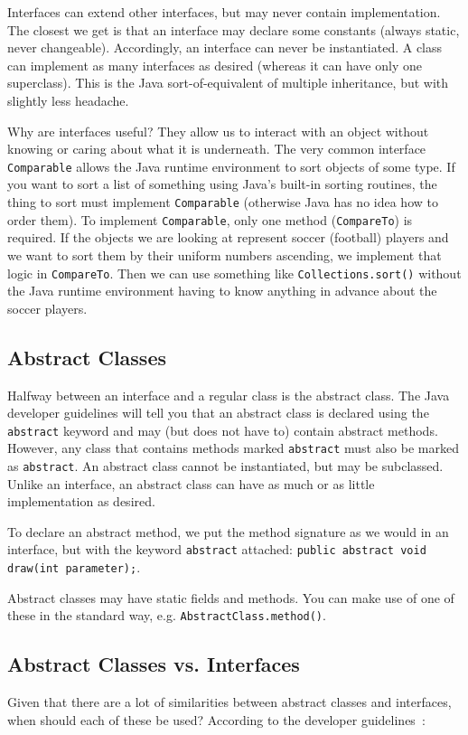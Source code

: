 Interfaces can extend other interfaces, but may never contain implementation. The closest we get is that an interface may declare some constants (always static, never changeable). Accordingly, an interface can never be instantiated. A class can implement as many interfaces as desired (whereas it can have only one superclass). This is the Java sort-of-equivalent of multiple inheritance, but with slightly less headache.

Why are interfaces useful? They allow us to interact with an object without knowing or caring about what it is underneath. The very common interface \texttt{Comparable} allows the Java runtime environment to sort objects of some type. If you want to sort a list of something using Java's built-in sorting routines, the thing to sort must implement \texttt{Comparable} (otherwise Java has no idea how to order them). To implement \texttt{Comparable}, only one method (\texttt{CompareTo}) is required. If the objects we are looking at represent soccer (football) players and we want to sort them by their uniform numbers ascending, we implement that logic in \texttt{CompareTo}. Then we can use something like \texttt{Collections.sort()} without the Java runtime environment having to know anything in advance about the soccer players.

\subsection*{Abstract Classes}
Halfway between an interface and a regular class is the abstract class. The Java developer guidelines will tell you that an abstract class is declared using the \texttt{abstract} keyword and may (but does not have to) contain abstract methods. However, any class that contains methods marked \texttt{abstract} must also be marked as \texttt{abstract}. An abstract class cannot be instantiated, but may be subclassed. Unlike an interface, an abstract class can have as much or as little implementation as desired.

To declare an abstract method, we put the method signature as we would in an interface, but with the keyword \texttt{abstract} attached: \verb+public abstract void draw(int parameter);+.

Abstract classes may have static fields and methods. You can make use of one of these in the standard way, e.g. \texttt{AbstractClass.method()}.

\subsection*{Abstract Classes vs. Interfaces}
Given that there are a lot of similarities between abstract classes and interfaces, when should each of these be used? According to the developer guidelines~\cite{java:abstract}:

